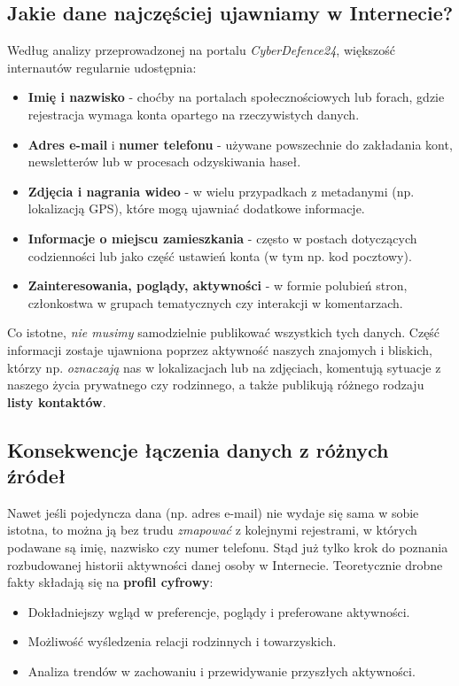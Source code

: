 \subsection{Jakie dane najczęściej ujawniamy w Internecie?}
Według analizy przeprowadzonej na portalu \emph{CyberDefence24}\cite{CYB_DEF_NAJCZĘSTRZE_DANE}, większość internautów regularnie udostępnia:
\begin{itemize}
    \item \textbf{Imię i nazwisko} - choćby na portalach społecznościowych lub forach, gdzie rejestracja wymaga konta opartego na rzeczywistych danych.
    \item \textbf{Adres e-mail} i \textbf{numer telefonu} - używane powszechnie do zakładania kont, newsletterów lub w procesach odzyskiwania haseł.
    \item \textbf{Zdjęcia i nagrania wideo} - w wielu przypadkach z metadanymi (np. lokalizacją GPS), które mogą ujawniać dodatkowe informacje.
    \item \textbf{Informacje o miejscu zamieszkania} - często w postach dotyczących codzienności lub jako część ustawień konta (w tym np. kod pocztowy).
    \item \textbf{Zainteresowania, poglądy, aktywności} - w formie polubień stron, członkostwa w grupach tematycznych czy interakcji w komentarzach.
\end{itemize}

Co istotne, \emph{nie musimy} samodzielnie publikować wszystkich tych danych. Część informacji zostaje ujawniona poprzez aktywność naszych znajomych i bliskich, którzy np. \emph{oznaczają} nas w lokalizacjach lub na zdjęciach, komentują sytuacje z naszego życia prywatnego czy rodzinnego, a także publikują różnego rodzaju \textbf{listy kontaktów}.

\subsection{Konsekwencje łączenia danych z różnych źródeł}
Nawet jeśli pojedyncza dana (np. adres e-mail) nie wydaje się sama w sobie istotna, to można ją bez trudu \emph{zmapować} z kolejnymi rejestrami, w których podawane są imię, nazwisko czy numer telefonu. Stąd już tylko krok do poznania rozbudowanej historii aktywności danej osoby w Internecie. Teoretycznie drobne fakty składają się na \textbf{profil cyfrowy}:
\begin{itemize}
    \item Dokładniejszy wgląd w preferencje, poglądy i preferowane aktywności.
    \item Możliwość wyśledzenia relacji rodzinnych i towarzyskich.
    \item Analiza trendów w zachowaniu i przewidywanie przyszłych aktywności.
\end{itemize}

